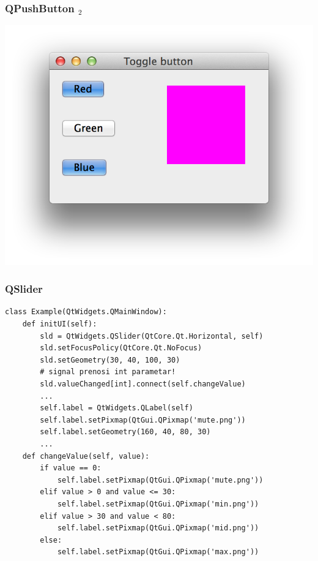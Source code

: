 \documentclass[utf8,compress,aspectratio=169]{beamer}
\begin{document}
\begin{frame}[fragile]
  \frametitle{QPushButton $_2$}
\begin{center}
\includegraphics[scale=0.5]{pyqt13.png}
\end{center}
\end{frame}

\begin{frame}
  \frametitle{QSlider}
\begin{verbatim}
class Example(QtWidgets.QMainWindow):
    def initUI(self):
        sld = QtWidgets.QSlider(QtCore.Qt.Horizontal, self)
        sld.setFocusPolicy(QtCore.Qt.NoFocus)
        sld.setGeometry(30, 40, 100, 30)
        # signal prenosi int parametar!
        sld.valueChanged[int].connect(self.changeValue)
        ...
        self.label = QtWidgets.QLabel(self)
        self.label.setPixmap(QtGui.QPixmap('mute.png'))
        self.label.setGeometry(160, 40, 80, 30)
        ...
    def changeValue(self, value):
        if value == 0:
            self.label.setPixmap(QtGui.QPixmap('mute.png'))
        elif value > 0 and value <= 30:
            self.label.setPixmap(QtGui.QPixmap('min.png'))
        elif value > 30 and value < 80:
            self.label.setPixmap(QtGui.QPixmap('mid.png'))
        else:
            self.label.setPixmap(QtGui.QPixmap('max.png'))
\end{verbatim}
\end{frame}
\end{document}
